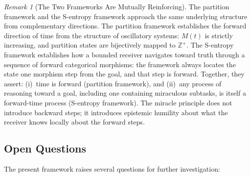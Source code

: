 \documentclass[twocolumn,10pt,a4paper]{article}
\theoremstyle{thmstyle}
\theoremstyle{definition}
\theoremstyle{remark}
\newtheorem{remark}[theorem]{Remark}
\newcommand{\Zp}{\mathbb{Z}^{+}}
\begin{document}
\begin{remark}[The Two Frameworks Are Mutually Reinforcing]
\label{rem:two-frameworks}
The partition framework and the S-entropy framework approach the same underlying structure from complementary directions. The partition framework establishes the forward direction of time from the structure of oscillatory systems: $M(t)$ is strictly increasing, and partition states are bijectively mapped to $\Zp$. The S-entropy framework establishes how a bounded receiver navigates toward truth through a sequence of forward categorical morphisms: the framework always locates the state one morphism step from the goal, and that step is forward. Together, they assert: (i)~time is forward (partition framework), and (ii)~any process of reasoning toward a goal, including one containing miraculous subtasks, is itself a forward-time process (S-entropy framework). The miracle principle does not introduce backward steps; it introduces epistemic humility about what the receiver knows locally about the forward steps.
\end{remark}

\subsection{Open Questions}

The present framework raises several questions for further investigation:
\end{document}

